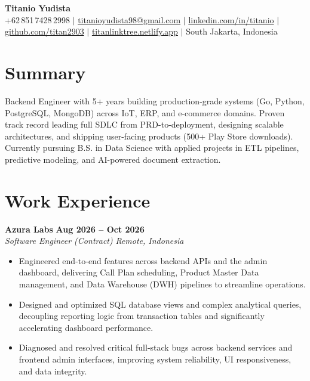 \documentclass[10pt, letterpaper]{article}
\newcommand{\jobheader}[4]{%
  \noindent\textbf{#1} \hfill \textbf{#2}\\[1pt]
  \textit{#3} \hfill \textit{#4}\\[1.5pt]
}
\begin{document}
\begin{center}
  {\Huge \bfseries \color{navy} Titanio Yudista}\\[4pt]
  {\small \color{textgray}
    +62\,851\,7428\,2998 \;\;$|$\;\;
    \href{mailto:titanioyudista98@gmail.com}{titanioyudista98@gmail.com} \;\;$|$\;\;
    \href{https://www.linkedin.com/in/titanio}{linkedin.com/in/titanio} \;\;$|$\;\;
    \href{https://github.com/titan2903}{github.com/titan2903} \;\;$|$\;\;
    \href{https://titanlinktree.netlify.app}{titanlinktree.netlify.app} \;\;$|$\;\;
    South Jakarta, Indonesia
  }
\end{center}
\vspace{-4pt}

\section{Summary}
Backend Engineer with 5+ years building production-grade systems (Go, Python, PostgreSQL, MongoDB) across IoT, ERP, and e-commerce domains. Proven track record leading full SDLC from PRD-to-deployment, designing scalable architectures, and shipping user-facing products (500+ Play Store downloads). Currently pursuing B.S. in Data Science with applied projects in ETL pipelines, predictive modeling, and AI-powered document extraction.


\section{Work Experience}

\jobheader{Azura Labs}{Aug 2026 -- Oct 2026}{Software Engineer (Contract)}{Remote, Indonesia}
\begin{itemize}
  \item Engineered end-to-end features across backend APIs and the admin dashboard, delivering Call Plan scheduling, Product Master Data management, and Data Warehouse (DWH) pipelines to streamline operations.
  \item Designed and optimized SQL database views and complex analytical queries, decoupling reporting logic from transaction tables and significantly accelerating dashboard performance.
  \item Diagnosed and resolved critical full-stack bugs across backend services and frontend admin interfaces, improving system reliability, UI responsiveness, and data integrity.
\end{itemize}
\vspace{2pt}
\end{document}
